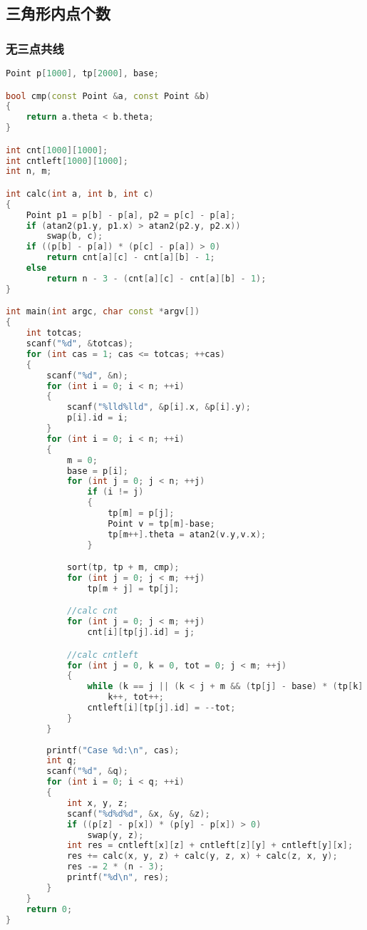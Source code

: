 \subsection{三角形内点个数}
	\subsubsection{无三点共线}
	\begin{lstlisting}[language=c++]
Point p[1000], tp[2000], base;

bool cmp(const Point &a, const Point &b)
{
	return a.theta < b.theta;
}

int cnt[1000][1000];
int cntleft[1000][1000];
int n, m;

int calc(int a, int b, int c)
{
	Point p1 = p[b] - p[a], p2 = p[c] - p[a];
	if (atan2(p1.y, p1.x) > atan2(p2.y, p2.x))
		swap(b, c);
	if ((p[b] - p[a]) * (p[c] - p[a]) > 0)
		return cnt[a][c] - cnt[a][b] - 1;
	else
		return n - 3 - (cnt[a][c] - cnt[a][b] - 1);
}

int main(int argc, char const *argv[])
{
	int totcas;
	scanf("%d", &totcas);
	for (int cas = 1; cas <= totcas; ++cas)
	{
		scanf("%d", &n);
		for (int i = 0; i < n; ++i)
		{
			scanf("%lld%lld", &p[i].x, &p[i].y);
			p[i].id = i;
		}
		for (int i = 0; i < n; ++i)
		{
			m = 0;
			base = p[i];
			for (int j = 0; j < n; ++j)
				if (i != j)
				{
					tp[m] = p[j];
					Point v = tp[m]-base;
					tp[m++].theta = atan2(v.y,v.x);
				}

			sort(tp, tp + m, cmp);
			for (int j = 0; j < m; ++j)
				tp[m + j] = tp[j];

			//calc cnt
			for (int j = 0; j < m; ++j)
				cnt[i][tp[j].id] = j;

			//calc cntleft
			for (int j = 0, k = 0, tot = 0; j < m; ++j)
			{
				while (k == j || (k < j + m && (tp[j] - base) * (tp[k] - base) > 0))
					k++, tot++;
				cntleft[i][tp[j].id] = --tot;
			}
		}
		
		printf("Case %d:\n", cas);
		int q;
		scanf("%d", &q);
		for (int i = 0; i < q; ++i)
		{
			int x, y, z;
			scanf("%d%d%d", &x, &y, &z);
			if ((p[z] - p[x]) * (p[y] - p[x]) > 0)
				swap(y, z);
			int res = cntleft[x][z] + cntleft[z][y] + cntleft[y][x];
			res += calc(x, y, z) + calc(y, z, x) + calc(z, x, y);
			res -= 2 * (n - 3);
			printf("%d\n", res);
		}
	}
	return 0;
}
	\end{lstlisting}
	

